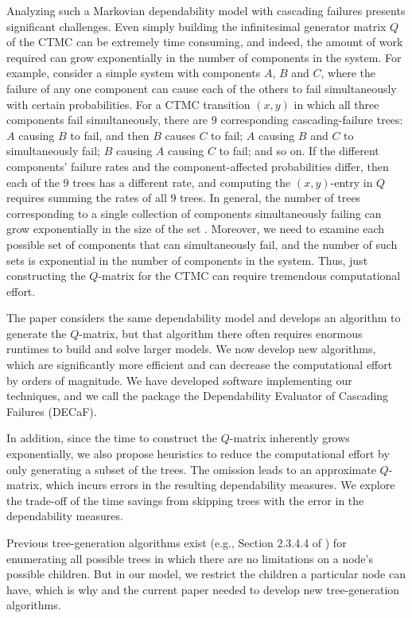 \documentclass[12pt]{article}
\begin{document}
Analyzing such a Markovian dependability
model with cascading failures
presents significant challenges.
Even simply
building the infinitesimal
generator matrix $Q$ of the
CTMC can be extremely time consuming,
and indeed, the amount of work required
can grow exponentially in the number
of components in the system.
For example, consider a simple
system with components $A$, $B$ and $C$,
where the failure of any one component
can cause each of the others
to fail simultaneously with certain
probabilities.
For a CTMC transition $(x,y)$ in which
all three components fail simultaneously,
there are $9$ corresponding
cascading-failure 
trees:
$A$ causing $B$ to fail, and then $B$
causes $C$ to fail;
$A$ causing $B$ and $C$ to simultaneously fail;
$B$ causing $A$ causing $C$ to fail;
and so on.
If the different
components' failure rates
and the component-affected probabilities
differ, then each of the $9$ trees
has a different rate,
and 
computing the $(x,y)$-entry in $Q$
requires summing the rates
of all $9$ trees.
In general, the number of trees
corresponding to a single collection
of components simultaneously failing
can grow exponentially in the size of the
set \cite{ING:2009}.  
Moreover, we need to examine
each possible set of components
that can simultaneously fail,
and the number of such
sets is exponential in the number
of components in the system.
Thus, just constructing the $Q$-matrix
for the CTMC can require tremendous
computational effort.

The paper \cite{ING:2009} 
considers the same dependability model
and develops
an algorithm to generate the $Q$-matrix,
but that algorithm
there often requires enormous
runtimes to build and solve larger models.  
We now develop
new algorithms, which are significantly
more efficient and can decrease the
computational effort by orders of magnitude.
We have developed software
implementing our techniques,
and we call the package
the Dependability Evaluator
of Cascading Failures (DECaF).

In addition, since the time to 
construct the $Q$-matrix 
inherently grows exponentially,
we also propose heuristics
to reduce the
computational effort by only 
generating a subset of the trees.
The omission
leads to an approximate $Q$-matrix,
which incurs errors in 
the resulting dependability measures.
We explore the trade-off
of the time savings from
skipping trees
with the error in the dependability
measures.

Previous tree-generation
algorithms exist (e.g.,
Section 2.3.4.4 of \cite{Knut:1997})
for enumerating
all possible trees in which there are
no limitations on a node's possible
children.
But in our model,
we restrict the
children a particular node
can have,
which is why \cite{ING:2009}
and the current paper
needed to develop
new tree-generation
algorithms.
\end{document}
